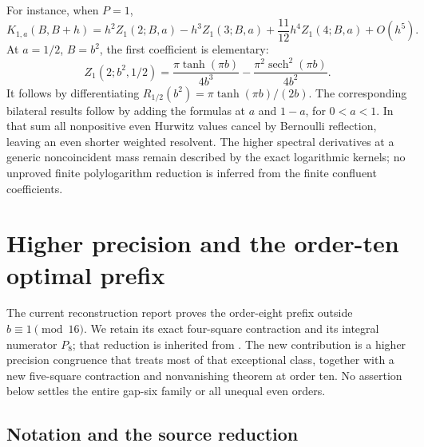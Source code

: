 \documentclass[11pt,a4paper]{article}
\numberwithin{equation}{section}
\theoremstyle{definition}
\theoremstyle{remark}
\begin{document}
For instance, when $P=1$,
\[
 K_{1,a}(B,B+h)
 =h^2Z_1(2;B,a)-h^3Z_1(3;B,a)
       +\frac{11}{12}h^4Z_1(4;B,a)+O(h^5).
\]
At $a=1/2$, $B=b^2$, the first coefficient is elementary:
\begin{equation}\label{mm:eq:half-explicit}
 Z_1(2;b^2,1/2)
 =\frac{\pi\tanh(\pi b)}{4b^3}
                     -\frac{\pi^2\operatorname{sech}^2(\pi b)}{4b^2}.
\end{equation}
It follows by differentiating
$R_{1/2}(b^2)=\pi\tanh(\pi b)/(2b)$.
The corresponding bilateral results follow by adding the formulas
at $a$ and $1-a$, for $0<a<1$.  In that sum all nonpositive even
Hurwitz values cancel by Bernoulli reflection, leaving an even shorter
weighted resolvent.  The higher spectral derivatives at a generic
noncoincident mass remain described by the exact logarithmic kernels;
no unproved finite polylogarithm reduction is inferred from the finite
confluent coefficients.



\section{Higher precision and the order-ten optimal prefix}
\label{rt:section}

The current reconstruction report proves the order-eight prefix outside
$b\equiv1\pmod{16}$. We retain its exact four-square contraction and
its integral numerator $P_8$; that reduction is inherited from \cite{PRR}. The new
contribution is a higher precision congruence that treats most of that
exceptional class, together with a new five-square contraction and
nonvanishing theorem at order ten. No assertion below settles the
entire gap-six family or all unequal even orders.

\subsection{Notation and the source reduction}
\end{document}
